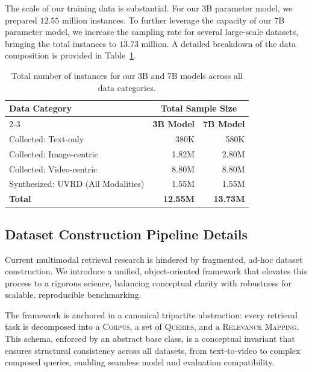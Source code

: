 The scale of our training data is substantial. For our 3B parameter model, we prepared $12.55$ million instances. To further leverage the capacity of our 7B parameter model, we increase the sampling rate for several large-scale datasets, bringing the total instances to $13.73$ million. A detailed breakdown of the data composition is provided in Table~\ref{gve:tab:data_summary}.

\begin{table}[t]
\centering
\caption{Total number of instances for our 3B and 7B models across all data categories.}
\label{gve:tab:data_summary}
\begin{tabular}{@{}lrr@{}}
\toprule
\textbf{Data Category} & \multicolumn{2}{c}{\textbf{Total Sample Size}} \\
\cmidrule(lr){2-3}
& \textbf{3B Model} & \textbf{7B Model} \\
\midrule
Collected: Text-only & 380K & 580K \\
Collected: Image-centric & 1.82M & 2.80M \\
Collected: Video-centric & 8.80M & 8.80M \\
Synthesized: UVRD (All Modalities) & 1.55M & 1.55M \\
\midrule[1.5pt]
\bfseries Total & \bfseries 12.55M & \bfseries 13.73M \\
\bottomrule
\end{tabular}
\end{table}





\fi

\iffalse %
\subsection{Dataset Construction Pipeline Details}\label{gve:app:data_construct}

Current multimodal retrieval research is hindered by fragmented, ad-hoc dataset construction. We introduce a unified, object-oriented framework that elevates this process to a rigorous science, balancing conceptual clarity with robustness for scalable, reproducible benchmarking.

The framework is anchored in a canonical tripartite abstraction: every retrieval task is decomposed into a \textsc{Corpus}, a set of \textsc{Queries}, and a \textsc{Relevance Mapping}. This schema, enforced by an abstract base class, is a conceptual invariant that ensures structural consistency across all datasets, from text-to-video to complex composed queries, enabling seamless model and evaluation compatibility.

